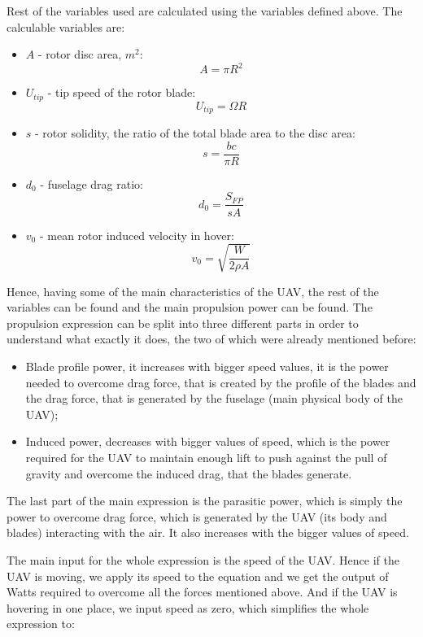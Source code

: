 \documentclass[11pt,a4paper,footinclude=true,headinclude=true, oneside]{scrbook}
\begin{document}
Rest of the variables used are calculated using the variables defined above. The calculable variables are:

\begin{itemize}
    \item \(A\) - rotor disc area, \(m^2\): 
        \[ A = \pi R^2\]
    \item \(U_{tip}\) - tip speed of the rotor blade:  
        \[ U_{tip}  = \Omega R\]
    \item \(s\) - rotor solidity, the ratio of the total blade area to the disc area:
        \[ s = \frac{bc}{\pi R} \]
    \item \(d_0\) - fuselage drag ratio:
        \[ d_0 = \frac{S_{FP}}{sA} \]
    \item \(v_0\) - mean rotor induced velocity in hover:
        \[ v_0 = \sqrt{\frac{W}{2\rho A}} \]
\end{itemize}

Hence, having some of the main characteristics of the UAV, the rest of the variables can be found and the main propulsion power can be found. The propulsion expression can be split into three different parts in order to understand what exactly it does, the two of which were already mentioned before: 

\begin{itemize}
    \item Blade profile power, it increases with bigger speed values, it is the power needed to overcome drag force, that is created by the profile of the blades and the drag force, that is generated by the fuselage (main physical body of the UAV);
    \item Induced power, decreases with bigger values of speed, which is the power required for the UAV to maintain enough lift to push against the pull of gravity and overcome the induced drag, that the blades generate.
\end{itemize}

The last part of the main expression is the parasitic power, which is simply the power to overcome drag force, which is generated by the UAV (its body and blades) interacting with the air. It also increases with the bigger values of speed.

The main input for the whole expression is the speed of the UAV. Hence if the UAV is moving, we apply its speed to the equation and we get the output of Watts required to overcome all the forces mentioned above. And if the UAV is hovering in one place, we input speed as zero, which simplifies the whole expression to:
\end{document}
